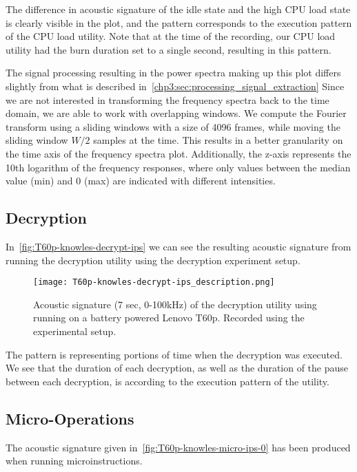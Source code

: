 The difference in acoustic signature of the idle state and the high \gls{CPU} load state is clearly visible in the plot, and the pattern corresponds to the execution pattern of the CPU load utility. 
Note that at the time of the recording, our \gls{CPU} load utility had the burn duration set to a single second, resulting in this pattern.

The signal processing resulting in the power spectra making up this plot differs slightly from what is described in~\autoref{chp3:sec:processing_signal_extraction}
Since we are not interested in transforming the frequency spectra back to the time domain, we are able to work with overlapping windows.
We compute the Fourier transform using a sliding windows with a size of 4096 frames, while moving the sliding window \({W/2}\) samples at the time.
This results in a better granularity on the time axis of the frequency spectra plot.
Additionally, the z-axis represents the 10th logarithm of the frequency responses, where only values between the median value (min) and 0 (max) are indicated with different intensities.


\subsection{Decryption}\label{chp5:subsec:t60p_knowles_results_decryption}
In~\autoref{fig:T60p-knowles-decrypt-ips} we can see the resulting acoustic signature from running the decryption utility using the decryption experiment setup.

\begin{figure}[ht]
    \centering
    \texttt{[image: T60p-knowles-decrypt-ips\_description.png]}
    \caption{Acoustic signature (7 sec, 0-100kHz) of the decryption utility using running on a battery powered Lenovo T60p.
        Recorded using the experimental setup.}
    \label{fig:T60p-knowles-decrypt-ips}
\end{figure}

The pattern is representing portions of time when the decryption was executed.
We see that the duration of each decryption, as well as the duration of the pause between each decryption, is according to the execution pattern of the utility.


\subsection{Micro-Operations}\label{chp5:subsec:t60p_knowles_results_micro}
The acoustic signature given in~\autoref{fig:T60p-knowles-micro-ips-0} has been produced when running microinstructions.

